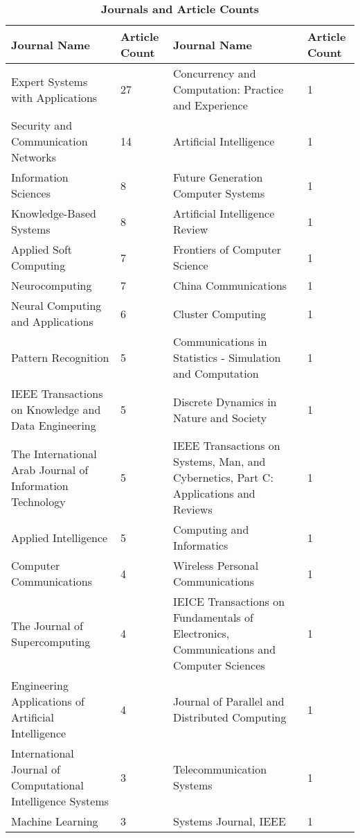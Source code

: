
\begin{table*}[!ht]
    \caption{ \textbf{Journals and Article Counts} }
    \label{table-JournalAndArticleCounts}
    \centering
   \begin{adjustbox}{max width=\textwidth}
    \normalsize
\begin{tabular}{llll}

\toprule

Journal Name & Article Count & Journal Name & Article Count \\

\midrule
Expert Systems with Applications & 27 & Concurrency and Computation: Practice and Experience & 1   \\ 
Security and Communication Networks & 14 & Artificial Intelligence & 1   \\ 
Information Sciences & 8 & Future Generation Computer Systems & 1   \\ 
Knowledge-Based Systems & 8 & Artificial Intelligence Review & 1   \\ 
Applied Soft Computing & 7 & Frontiers of Computer Science & 1   \\ 
Neurocomputing & 7 & China Communications & 1   \\ 
Neural Computing and Applications & 6 & Cluster Computing & 1   \\ 
Pattern Recognition & 5 & Communications in Statistics - Simulation and Computation & 1   \\ 
IEEE Transactions on Knowledge and Data Engineering & 5 & Discrete Dynamics in Nature and Society & 1   \\ 
The International Arab Journal of Information Technology & 5 & IEEE Transactions on Systems, Man, and Cybernetics, Part C: Applications and Reviews & 1   \\ 
Applied Intelligence & 5 & Computing and Informatics & 1   \\ 
Computer Communications & 4 & Wireless Personal Communications & 1   \\ 
The Journal of Supercomputing & 4 & IEICE Transactions on Fundamentals of Electronics, Communications and Computer Sciences & 1   \\ 
Engineering Applications of Artificial Intelligence & 4 & Journal of Parallel and Distributed Computing & 1   \\ 
International Journal of Computational Intelligence Systems & 3 & Telecommunication Systems & 1   \\ 
Machine Learning & 3 & Systems Journal, IEEE & 1   \\ 

\end{tabular}
\end{adjustbox}
\end{table*}
